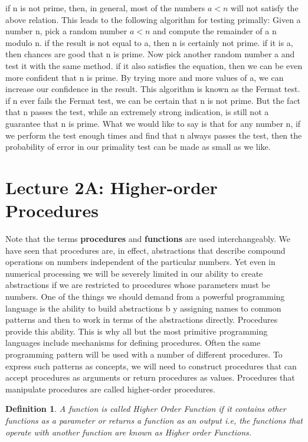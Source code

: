 \documentclass[a4paper,twoside]{article}
\newtheorem{definition}[theorem]{Definition}
\numberwithin{equation}{section}
\begin{document}
if n is not prime, then, in general, most of the numbers $a < n$ will
not satisfy the above relation. This leads to the following algorithm for testing primally:
Given a number n, pick a random number $a < n$ and compute the remainder of a n modulo n. if the
result is not equal to a, then n is certainly not prime. if it is a, then chances are good that n is
prime. Now pick another random number a and test it with the same
method. if it also satisfies the equation, then we can be even more confident that n is prime.
By trying more and more values of a, we can
increase our confidence in the result. This algorithm is known as the
Fermat test. if n ever fails the Fermat test, we can be certain that n is not prime. But the fact
that n passes the test, while an extremely strong indication, is still not a guarantee that n is prime.
What we would like to say is that for any number n, if we perform the test enough times and find that
n always passes the test, then the probability of error in our primality test can be made as small
as we like.

\section{Lecture 2A: Higher-order Procedures}
Note that the terms \textbf{procedures} and \textbf{functions} are used interchangeably. We have seen
that procedures are, in effect, abstractions that describe compound operations on numbers independent
of the particular numbers. Yet even in numerical processing we will be severely limited in our ability
to create abstractions if we are restricted to procedures whose parameters must be numbers. One of
the things we should demand from a powerful programming language is the ability to build abstractions b
y assigning names to common patterns and then to work in terms of the abstractions directly.
Procedures provide this ability. This is why all but the most primitive programming
languages include mechanisms for defining procedures. Often the same programming pattern will be
used with a number of different procedures. To express such patterns as concepts, we will need
to construct procedures that can accept procedures as arguments or return procedures as values.
Procedures that manipulate procedures are called higher-order procedures.
\begin{definition}
    A function is called Higher Order Function if it contains other functions as a parameter or
    returns a function as an output i.e, the functions that operate with another function are
    known as Higher order Functions.
\end{definition}
\end{document}
